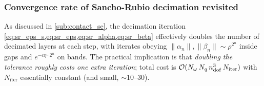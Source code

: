\subsubsection{Convergence rate of Sancho-Rubio decimation revisited}

As discussed in \cref{sub:contact_se}, the decimation iteration
\cref{eq:sr_eps_s,eq:sr_eps,eq:sr_alpha,eq:sr_beta} effectively doubles
the number of decimated layers at each step, with iterates obeying
$\|\alpha_n\|, \|\beta_n\| \sim \rho^{2^n}$ inside gaps and
$e^{-c\eta\cdot 2^n}$ on bands. The practical implication is that
\emph{doubling the tolerance roughly costs one extra iteration}; total
cost is $\mathcal{O}(N_\omega\,N_q\,n_{\mathrm{dof}}^3\,N_{\mathrm{iter}})$
with $N_{\mathrm{iter}}$ essentially constant (and small,
$\sim 10\text{--}30$).

